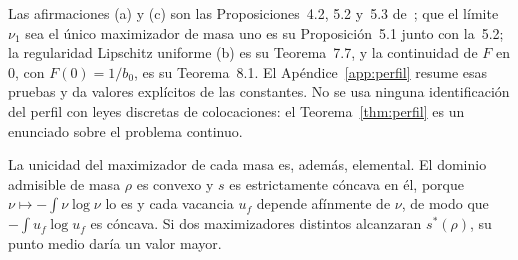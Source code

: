 Las afirmaciones (a) y (c) son las Proposiciones~4.2, 5.2 y~5.3 de~\cite{Perfil}; que el
límite $\nu_1$ sea el único maximizador de masa uno es su Proposición~5.1 junto con la~5.2; la
regularidad Lipschitz uniforme (b) es su Teorema~7.7, y la continuidad de $F$ en $0$, con
$F(0)=1/b_0$, es su Teorema~8.1. El Apéndice~\ref{app:perfil} resume esas pruebas y da valores
explícitos de las constantes. No se usa ninguna identificación del perfil con leyes discretas de
colocaciones:
el Teorema~\ref{thm:perfil} es un enunciado sobre el problema continuo.

La unicidad del maximizador de cada masa es, además, elemental. El dominio admisible de masa
$\rho$ es convexo y $s$ es estrictamente cóncava en él, porque $\nu\mapsto-\int\nu\log\nu$ lo es
y cada vacancia $u_f$ depende afínmente de $\nu$, de modo que $-\int u_f\log u_f$ es cóncava. Si
dos maximizadores distintos alcanzaran $s^*(\rho)$, su punto medio daría un valor mayor.
